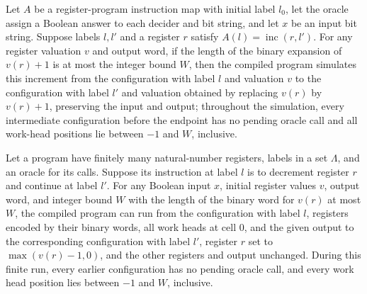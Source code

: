 \begin{lemma}
\label{Complexity.LogProg.sim_inc}
\leanok
{}
Let $A$ be a register-program instruction map with initial label $l_0$, let the oracle
assign a Boolean answer to each decider and bit string, and let $x$ be an input bit
string. Suppose labels $l,l'$ and a register $r$ satisfy
$A(l)=\operatorname{inc}(r,l')$. For any register valuation $v$ and output word, if the
length of the binary expansion of $v(r)+1$ is at most the integer bound $W$, then the
compiled program simulates this increment from the configuration with label $l$ and
valuation $v$ to the configuration with label $l'$ and valuation obtained by replacing
$v(r)$ by $v(r)+1$, preserving the input and output; throughout the simulation, every
intermediate configuration before the endpoint has no pending oracle call and all
work-head positions lie between $-1$ and $W$, inclusive.
\end{lemma}

\begin{lemma}
\label{Complexity.LogProg.sim_dec}
\leanok
{}
Let a program have finitely many natural-number registers, labels in a set $\Lambda$,
and an oracle for its calls. Suppose its instruction at label $l$ is to decrement
register $r$ and continue at label $l'$. For any Boolean input $x$, initial register
values $v$, output word, and integer bound $W$ with the length of the binary word for
$v(r)$ at most $W$, the compiled program can run from the configuration with label $l$,
registers encoded by their binary words, all work heads at cell $0$, and the given
output to the corresponding configuration with label $l'$, register $r$ set to
$\max(v(r)-1,0)$, and the other registers and output unchanged. During this finite run,
every earlier configuration has no pending oracle call, and every work head position
lies between $-1$ and $W$, inclusive.
\end{lemma}

